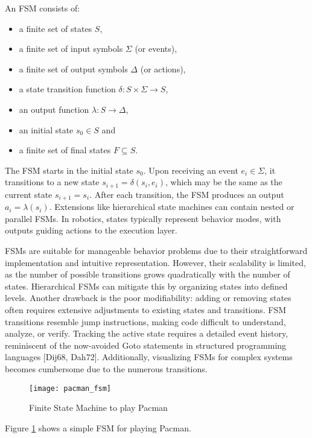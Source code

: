 An FSM consists of:

\begin{itemize}
  \item a finite set of states $S$,
  \item a finite set of input symbols $\Sigma$ (or events),
  \item a finite set of output symbols $\Delta$ (or actions),
  \item a state transition function $\delta: S \times \Sigma \rightarrow S$,
  \item an output function $\lambda: S \rightarrow \Delta$,
  \item an initial state $s_0 \in S$ and
  \item a finite set of final states $F \subseteq S$.
\end{itemize}

The FSM starts in the initial state $s_0$.
Upon receiving an event $e_i \in \Sigma$, it transitions to a new state $s_{i+1} = \delta(s_i, e_i)$, which may be the same as the current state $s_{i+1} = s_i$.
After each transition, the FSM produces an output $a_i = \lambda(s_i)$.
Extensions like hierarchical state machines can contain nested or parallel FSMs.
In robotics, states typically represent behavior modes, with outputs guiding actions to the execution layer.

FSMs are suitable for manageable behavior problems due to their straightforward implementation and intuitive representation.
However, their scalability is limited, as the number of possible transitions grows quadratically with the number of states.
Hierarchical FSMs can mitigate this by organizing states into defined levels.
Another drawback is the poor modifiability: adding or removing states often requires extensive adjustments to existing states and transitions.
FSM transitions resemble jump instructions, making code difficult to understand, analyze, or verify.
Tracking the active state requires a detailed event history, reminiscent of the now-avoided Goto statements in structured programming languages [Dij68, Dah72].
Additionally, visualizing FSMs for complex systems becomes cumbersome due to the numerous transitions.

\begin{figure}
  \centering
  \texttt{[image: pacman\_fsm]}

  \caption{Finite State Machine to play Pacman}%
  \label{fig:pacman_fsm}
\end{figure}

Figure \ref{fig:pacman_fsm} shows a simple FSM for playing Pacman.

